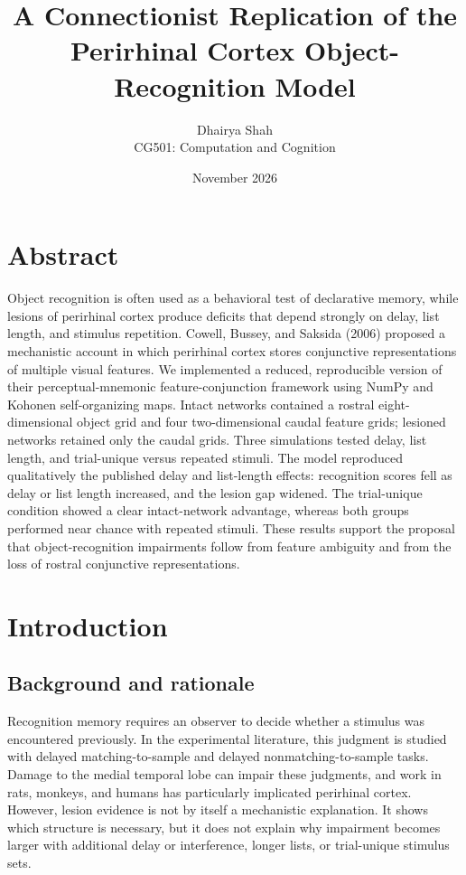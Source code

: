 \documentclass[11pt]{article}
\title{A Connectionist Replication of the Perirhinal Cortex Object-Recognition Model}
\author{Dhairya Shah\\CG501: Computation and Cognition}
\date{November 2026}
\begin{document}
\maketitle

\section*{Abstract}
Object recognition is often used as a behavioral test of declarative memory, while lesions of perirhinal cortex produce deficits that depend strongly on delay, list length, and stimulus repetition. Cowell, Bussey, and Saksida (2006) proposed a mechanistic account in which perirhinal cortex stores conjunctive representations of multiple visual features. We implemented a reduced, reproducible version of their perceptual-mnemonic feature-conjunction framework using NumPy and Kohonen self-organizing maps. Intact networks contained a rostral eight-dimensional object grid and four two-dimensional caudal feature grids; lesioned networks retained only the caudal grids. Three simulations tested delay, list length, and trial-unique versus repeated stimuli. The model reproduced qualitatively the published delay and list-length effects: recognition scores fell as delay or list length increased, and the lesion gap widened. The trial-unique condition showed a clear intact-network advantage, whereas both groups performed near chance with repeated stimuli. These results support the proposal that object-recognition impairments follow from feature ambiguity and from the loss of rostral conjunctive representations.

\section{Introduction}
\subsection{Background and rationale}
Recognition memory requires an observer to decide whether a stimulus was encountered previously. In the experimental literature, this judgment is studied with delayed matching-to-sample and delayed nonmatching-to-sample tasks. Damage to the medial temporal lobe can impair these judgments, and work in rats, monkeys, and humans has particularly implicated perirhinal cortex. However, lesion evidence is not by itself a mechanistic explanation. It shows which structure is necessary, but it does not explain why impairment becomes larger with additional delay or interference, longer lists, or trial-unique stimulus sets.
\end{document}
